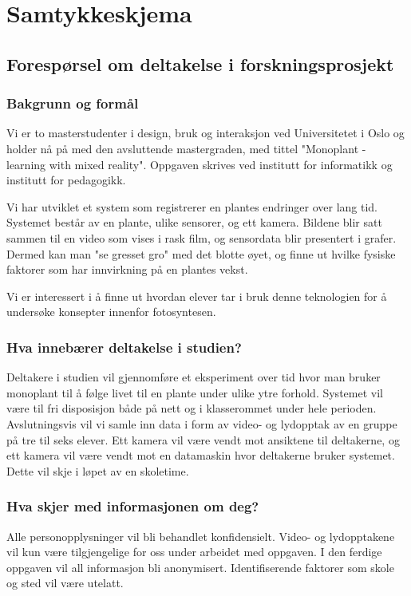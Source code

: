 


%
\section{Samtykkeskjema}
\label{samtykkeskjema}
\subsection*{Forespørsel om deltakelse i forskningsprosjekt}


\subsubsection*{Bakgrunn og formål}
Vi er to masterstudenter i design, bruk og interaksjon ved Universitetet i Oslo og holder nå på med den avsluttende mastergraden, med tittel "Monoplant - learning with mixed reality". Oppgaven skrives ved institutt for informatikk og institutt for pedagogikk. 

Vi har utviklet et system som registrerer en plantes endringer over lang tid. Systemet består av en plante, ulike sensorer, og ett kamera. Bildene blir satt sammen til en video som vises i rask film, og sensordata blir presentert i grafer. Dermed kan man "se gresset gro" med det blotte øyet, og finne ut hvilke fysiske faktorer som har innvirkning på en plantes vekst. 

Vi er interessert i å finne ut hvordan elever tar i bruk denne teknologien for å undersøke konsepter innenfor fotosyntesen. 

\subsubsection*{Hva innebærer deltakelse i studien?}
Deltakere i studien vil gjennomføre et eksperiment over tid hvor man bruker monoplant til å følge livet til en plante under ulike ytre forhold. Systemet vil være til fri disposisjon både på nett og i klasserommet under hele perioden. Avslutningsvis vil vi samle inn data i form av video- og lydopptak av en gruppe på tre til seks elever. Ett kamera vil være vendt mot ansiktene til deltakerne, og ett kamera vil være vendt mot en datamaskin hvor deltakerne bruker systemet. Dette vil skje i løpet av en skoletime. 

\subsubsection*{Hva skjer med informasjonen om deg?}
Alle personopplysninger vil bli behandlet konfidensielt. Video- og lydopptakene vil kun være tilgjengelige for oss under arbeidet med oppgaven. I den ferdige oppgaven vil all informasjon bli anonymisert. Identifiserende faktorer som skole og sted vil være utelatt. 

